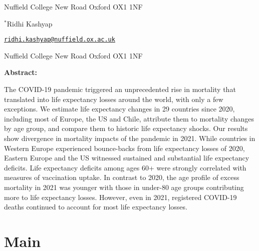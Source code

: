 \documentclass[12pt]{article}
\begin{document}
\begin{titlepage}
{Nuffield College
New Road
Oxford OX1 1NF

\vspace{1em}

$^{*}$Ridhi Kashyap

\href{mailto:ridhi.kashyap@nuffield.ox.ac.uk}{\texttt{ridhi.kashyap@nuffield.ox.ac.uk}}

Nuffield College
New Road
Oxford OX1 1NF

\par\medskip}


\clearpage

{\textbf{Abstract:}\par

The COVID-19 pandemic triggered an unprecedented rise in mortality that translated into life expectancy losses around the world, with only a few exceptions. We estimate life expectancy changes in 29 countries since 2020, including most of Europe, the US and Chile, attribute them to mortality changes by age group, and compare them to historic life expectancy shocks. Our results show divergence in mortality impacts of the pandemic in 2021. While countries in Western Europe experienced bounce-backs from life expectancy losses of 2020, Eastern Europe and the US witnessed sustained and substantial life expectancy deficits. Life expectancy deficits among ages 60+ were strongly correlated with measures of vaccination uptake. In contrast to 2020, the age profile of excess mortality in 2021 was younger with those in under-80 age groups contributing more to life expectancy losses. However, even in 2021, registered COVID-19 deaths continued to account for most life expectancy losses.

\par\medskip}

\clearpage

\end{titlepage}


\section*{Main}
\end{document}
